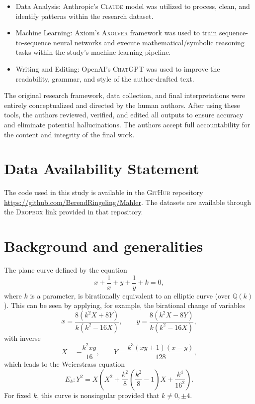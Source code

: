\documentclass[12pt]{amsart}%
\newcommand{\1}{\mathds{1}}
\newcommand{\Q}{\mathbb{Q}}
\theoremstyle{definition}
\numberwithin{equation}{section}
\numberwithin{table}{section}
\numberwithin{figure}{section}
\begin{document}
\begin{itemize}\item Data Analysis: Anthropic's \textsc{Claude} model was utilized to process, clean, and identify patterns within the research dataset.

\item Machine Learning: Axiom's \textsc{Axolver} framework was used to train sequence-to-sequence neural networks and execute mathematical/symbolic reasoning tasks within the study's machine learning pipeline.

\item Writing and Editing: OpenAI's \textsc{ChatGPT} was used  to improve the readability, grammar, and style of the author-drafted text.
\end{itemize}

The original research framework, data collection, and final interpretations were entirely conceptualized and directed by the human authors. After using these tools, the authors reviewed, verified, and edited all outputs to ensure accuracy and eliminate potential hallucinations. The authors accept full accountability for the content and integrity of the final work.


\section*{Data Availability Statement}
The code used in this study is available in the \textsc{GitHub} repository
\url{https://github.com/BerendRingeling/Mahler}. The datasets are available
through the \textsc{Dropbox} link provided in that repository.


\section{Background and generalities} \label{sec:background}

The plane curve defined by the equation
\[x+\frac{1}{x} + y + \frac{1}{y} + k=0,\]
where $k$ is a parameter, is birationally equivalent to an elliptic curve (over $\Q(k)$). This can be seen by applying, for example, the birational change of variables
\[
x=\frac{8(k^2X+8Y)}{k(k^2-16X)},
\qquad
y=\frac{8(k^2X-8Y)}{k(k^2-16X)},
\]
with inverse
\[
X=-\frac{k^2xy}{16},
\qquad
Y=\frac{k^3(xy+1)(x-y)}{128},
\]
which
leads to the Weierstrass equation
\begin{equation}\label{eq:Weierstrass}
E_k: Y^2 = X\left(X^2 + \frac{k^2}{8}\left(\frac{k^2}{8} - 1\right)X + \frac{k^4}{16^2}\right).
\end{equation}
For fixed $k$, this curve is nonsingular provided that $k\neq 0,\pm4$.
\end{document}
